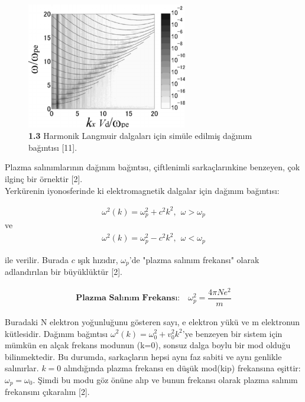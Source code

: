 \documentclass[a4paper,11pt]{article}
\begin{document}
\begin{figure}[h]
	\centering
	\includegraphics[width=7cm,keepaspectratio=true]{img/Harmonic.jpg}
	\caption* {\textbf{1.3} Harmonik Langmuir dalgaları için simüle edilmiş dağınım bağıntısı [11].}
\end{figure}

Plazma salınımlarının dağınım bağıntısı, çiftlenimli sarkaçlarınkine benzeyen, çok ilginç bir örnektir [2]. \\



Yerkürenin iyonosferinde ki elektromagnetik dalgalar için dağınım bağıntısı:

\begin{align}
\omega^{2}(k) = \omega^{2}_{p} + c^{2} k^{2}, \ \ \omega > \omega_{p}
\end{align}
ve
\begin{align}
\omega^{2}(k) = \omega^{2}_{p} - c^{2} k^{2}, \ \ \omega < \omega_{p}
\end{align}

ile verilir. Burada $ c $ ışık hızıdır, $ \omega_{p} $'de "plazma salınım frekansı" olarak adlandırılan bir büyüklüktür  [2].

\newpage

\begin{align}
\textbf{Plazma Salınım Frekansı:} \quad \omega_{p}^{2} = \dfrac{4 \pi N e^{2}}{m}
\end{align}

Buradaki N elektron yoğunluğunu gösteren sayı, e elektron yükü ve m elektronun kütlesidir. Dağınım bağıntısı $ \omega^{2}(k) = \omega^{2}_{0} + v_{0}^{2} k^{2} $'ye benzeyen bir sistem için mümkün en alçak frekans modunun (k=0), sonsuz dalga boylu bir mod olduğu bilinmektedir. Bu durumda, sarkaçların hepsi aynı faz sabiti ve aynı genlikle salınırlar. $ k=0 $ alındığında plazma frekansı en düşük mod(kip) frekansına eşittir: $\omega_p=\omega_0$. Şimdi bu modu göz önüne alıp ve bunun frekansı olarak plazma salınım frekansını çıkaralım  [2].
\end{document}
